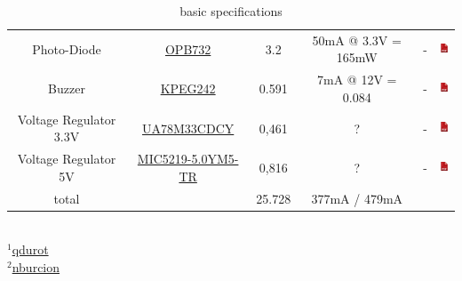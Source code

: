 \documentclass[
10pt,
a4paper,
]{article}
\begin{document}
\begin{center}
\begin{@twocolumnfalse}
\begin{table}[!hbt]
{\begin{tabular}{|c|c|c|c|c|c|}
					Photo-Diode &
					\href{http://fr.farnell.com/optek-technology/opb732/capteur-reflectif-pcb/dp/1226877}
					{OPB732} & 3.2 & 50mA @ 3.3V = 165mW &
					- &
					\href{http://www.farnell.com/datasheets/2331536.pdf}{\includegraphics[height=1em]{pdf.png}}\\
					    
					Buzzer &
					\href{http://fr.farnell.com/tdk/ps1240p02ct3/buzze-piezoelectronique-3v-4khz/dp/2803350}
					{KPEG242} & 0.591 & 7mA @ 12V = 0.084 &
					- &
					\href{http://fr.farnell.com/kingstate/kpeg242/piezo-buzzer-pin-type/dp/1502726}{\includegraphics[height=1em]{pdf.png}}\\
					    
					Voltage Regulator 3.3V &
					\href{http://fr.farnell.com/texas-instruments/ua78m33cdcy/regul-de-tension-2vdo-0-5a-3-3v/dp/2296031?st=voltage\%20regulator}
					{UA78M33CDCY} &  0,461 & ? &
					- &
					\href{http://www.ti.com/lit/ds/symlink/ua78m.pdf}{\includegraphics[height=1em]{pdf.png}}\\
					    
					Voltage Regulator 5V &
					\href{http://fr.farnell.com/microchip/mic5219-5-0ym5-tr/ldo-0-5vdo-0-5a-5v-1-5sot23/dp/2510257}
					{MIC5219-5.0YM5-TR} & 0,816  & ? &
					- &
					\href{http://www.farnell.com/datasheets/683599.pdf}{\includegraphics[height=1em]{pdf.png}}\\
					    
					\hline
					total && 25.728 & 377mA / 479mA & \\
					\hline
				\end{tabular}
			}
			\caption{basic specifications}
		\end{table}
	\end{@twocolumnfalse}
\end{center}


\footnotesize
{
	\mbox{}\\
	$^1$\href{https://profile.intra.42.fr/users/qdurot}{qdurot} \\
	$^2$\href{https://profile.intra.42.fr/users/nburcion}{nburcion}
}
\end{document}
